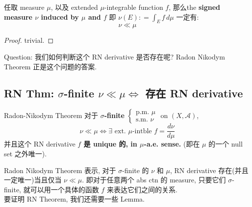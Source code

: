 \documentclass[lang=cn,11pt]{elegantbook}
\begin{document}
\begin{proposition}
    任取 measure $\mu$, 以及 extended $\mu$-integrable function $f$, 那么the \textbf{signed measure $\nu$ induced by $\mu$ and $f$} 即 \(\nu (E) : = \int_E f\, d\mu\) 一定有: \[    \nu \ll \mu    \]
\end{proposition}
\begin{proof}
    trivial.
\end{proof}



Question: 我们如何判断这个 RN derivative 是否存在呢? Radon Nikodym Theorem 正是这个问题的答案.
\subsection{RN Thm: $\sigma$-finite $\nu \ll \mu \iff $ 存在 RN derivative }
\begin{theorem}{Radon-Nikodym Theorem}
    对于 \textbf{$\sigma$-finite} \(\begin{cases}
        \text{p.m. } \mu\\
        \text{s.m. } \nu
    \end{cases} \) on $(X,\mathcal{A})$, \[
    \nu \ll \mu \iff \exists  \text{ ext. } \mu \text{-intble }f = \frac{d\nu}{d\mu}
    \]
    并且这个 RN derivative \textbf{$f$ 是 \textbf{unique 的, in $\mu$-a.e. sense.} }(即在 $\mu$ 的一个 null set 之外唯一).
\end{theorem}
Radon Nikodym Theorem 表示, 对于 $\sigma$-finite 的 $\nu$ 和 $\mu$, RN derivative 存在(并且一定唯一)当且仅当 $\nu \ll \mu$. 即对于任意两个 abs ctn 的 measure, 只要它们 $\sigma $-finite, 就可以用一个具体的函数 $f$ 来表达它们之间的关系.\\


要证明 RN Theorem, 我们还需要一些 Lemma.
\end{document}
